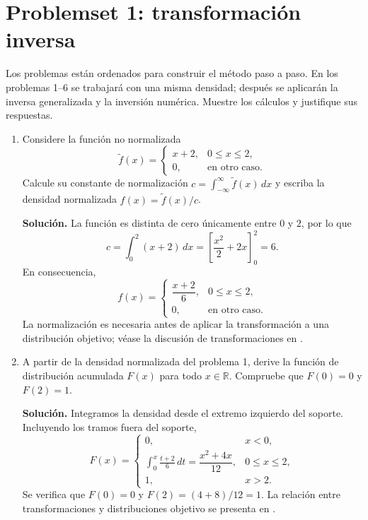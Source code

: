 \documentclass[11pt]{article}
\begin{document}
\section*{Problemset 1: transformación inversa}

Los problemas están ordenados para construir el método paso a paso. En los
problemas 1--6 se trabajará con una misma densidad; después se aplicarán la
inversa generalizada y la inversión numérica. Muestre los cálculos y justifique
sus respuestas.

\begin{enumerate}
    \item Considere la función no normalizada
    \[
        \widetilde f(x)=\begin{cases}x+2,&0\leq x\leq2,\\0,&\text{en otro caso.}\end{cases}
    \]
    Calcule su constante de normalización $c=\int_{-\infty}^{\infty}\widetilde
    f(x)\,dx$ y escriba la densidad normalizada $f(x)=\widetilde f(x)/c$.

    \textbf{Solución.} La función es distinta de cero únicamente entre $0$ y
    $2$, por lo que
    \[
        c=\int_0^2(x+2)\,dx
        =\left[\frac{x^2}{2}+2x\right]_0^2=6.
    \]
    En consecuencia,
    \[
        f(x)=\begin{cases}
            \dfrac{x+2}{6},&0\leq x\leq2,\\
            0,&\text{en otro caso.}
        \end{cases}
    \]
    La normalización es necesaria antes de aplicar la transformación a una
    distribución objetivo; véase la discusión de transformaciones en
    \cite[Sec.~7.2]{press1992numerical}.

    \item A partir de la densidad normalizada del problema 1, derive la función
    de distribución acumulada $F(x)$ para todo $x\in\mathbb{R}$. Compruebe
    que $F(0)=0$ y $F(2)=1$.

    \textbf{Solución.} Integramos la densidad desde el extremo izquierdo del
    soporte. Incluyendo los tramos fuera del soporte,
    \[
        F(x)=\begin{cases}
            0,&x<0,\\[2pt]
            \displaystyle\int_0^x\frac{t+2}{6}\,dt
            =\dfrac{x^2+4x}{12},&0\leq x\leq2,\\[6pt]
            1,&x>2.
        \end{cases}
    \]
    Se verifica que $F(0)=0$ y $F(2)=(4+8)/12=1$. La relación entre
    transformaciones y distribuciones objetivo se presenta en
    \cite[Sec.~7.2]{press1992numerical}.


\end{enumerate}
\end{document}
